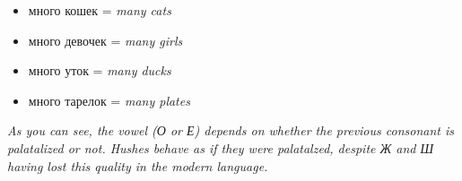 \begin{itemize}
\tightlist
\item
  много кошек = \emph{many cats}
\item
  много девочек = \emph{many girls}
\item
  много уток = \emph{many ducks}
\item
  много тарелок = \emph{many plates}
\end{itemize}

\emph{As you can see, the vowel (О or Е) depends on whether the previous
consonant is palatalized or not. Hushes behave as if they were
palatalzed, despite Ж and Ш having lost this quality in the modern
language.}

